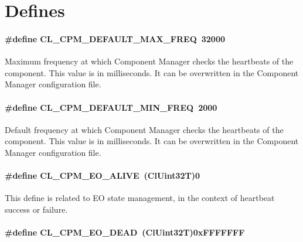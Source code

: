 \section{Defines}

\hypertarget{group__group14_ga66}{
\paragraph[CL\_\-CPM\_\-DEFAULT\_\-MAX\_\-FREQ]{\setlength{\rightskip}{0pt plus 5cm}\#define CL\_\-CPM\_\-DEFAULT\_\-MAX\_\-FREQ~32000}\hfill}
\label{group__group14_ga66}


Maximum frequency at which Component Manager checks the heartbeats of the component. This value is in milliseconds. It can be overwritten in the
Component Manager configuration file. \hypertarget{group__group14_ga65}{
\paragraph[CL\_\-CPM\_\-DEFAULT\_\-MIN\_\-FREQ]{\setlength{\rightskip}{0pt plus 5cm}\#define CL\_\-CPM\_\-DEFAULT\_\-MIN\_\-FREQ~2000}\hfill}
\label{group__group14_ga65}


Default frequency at which Component Manager checks the heartbeats of the component. This value is in milliseconds. It can be overwritten in the 
Component Manager configuration file. \hypertarget{group__group14_ga57}{
\paragraph[CL\_\-CPM\_\-EO\_\-ALIVE]{\setlength{\rightskip}{0pt plus 5cm}\#define CL\_\-CPM\_\-EO\_\-ALIVE~(Cl\-Uint32T)0}\hfill}
\label{group__group14_ga57}


This define is related to EO state management, in the context of heartbeat success or failure. \hypertarget{group__group14_ga58}{
\paragraph[CL\_\-CPM\_\-EO\_\-DEAD]{\setlength{\rightskip}{0pt plus 5cm}\#define CL\_\-CPM\_\-EO\_\-DEAD~(Cl\-Uint32T)0x\-FFFFFFF}\hfill}
\label{group__group14_ga58}


